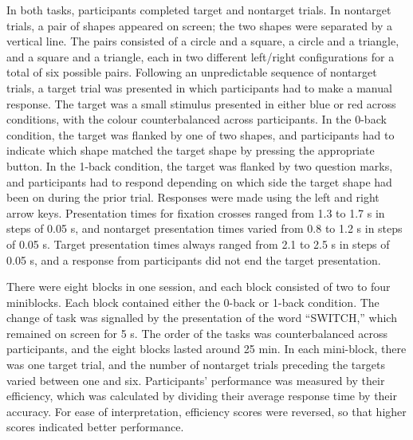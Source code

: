 In both tasks, participants completed target and nontarget trials. In nontarget trials, a pair of shapes appeared on screen; the two shapes were separated by a vertical line. The pairs consisted of a circle and a square, a circle and a triangle, and a square and a triangle, each in two different left/right configurations for a total of six possible pairs. Following an unpredictable sequence of nontarget trials, a target trial was presented in which participants had to make a manual response. The target was a small stimulus presented in either blue or red across conditions, with the colour counterbalanced across participants. In the 0-back condition, the target was flanked by one of two shapes, and participants had to indicate which shape matched the target shape by pressing the appropriate button. In the 1-back condition, the target was flanked by two question marks, and participants had to respond depending on which side the target shape had been on during the prior trial. Responses were made using the left and right arrow keys. Presentation times for fixation crosses ranged from 1.3 to 1.7 s in steps of 0.05 s, and nontarget presentation times varied from 0.8 to 1.2 s in steps of 0.05 s. Target presentation times always ranged from 2.1 to 2.5 s in steps of 0.05 s, and a response from participants did not end the target presentation.

There were eight blocks in one session, and each block consisted of two to four miniblocks. Each block contained either the 0-back or 1-back condition. The change of task was signalled by the presentation of the word “SWITCH,” which remained on screen for 5 s. The order of the tasks was counterbalanced across participants, and the eight blocks lasted around 25 min. In each mini-block, there was one target trial, and the number of nontarget trials preceding the targets varied between one and six. Participants' performance was measured by their efficiency, which was calculated by dividing their average response time by their accuracy. For ease of interpretation, efficiency scores were reversed, so that higher scores indicated better performance.


